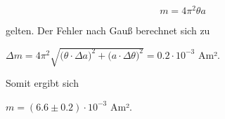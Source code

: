 \begin{equation}
  m = 4 \pi^2 \theta a
\end{equation}

gelten. Der Fehler nach Gauß berechnet sich zu

\vspace{.5em}
\centerline{$\Delta m = 4 \pi^2 \sqrt{ \bigg( \theta \cdot \Delta a \bigg)^2 + \bigg( a \cdot \Delta \theta \bigg)^2 } = 0.2 \cdot 10^{-3}$ Am².}
\vspace{.5em}

Somit ergibt sich

\vspace{.5em}
\centerline{$m = (6.6 \pm 0.2) \cdot 10^{-3}$ Am².}
\vspace{.5em}